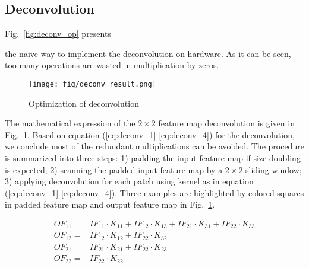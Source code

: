 \documentclass[conference]{IEEEtran}
\begin{document}
\begin{comment}
\begin{verbatim}
for no in Nof ----------> Output channel loop
  for (y,x) in (Y-K,X-K) --> Feature map loop
    for ni in Nif -------> input channel loop
      for (kx,ky) in (K,K) -----> Kernel loop
            Fout[no,y,x] += Fin[ni,y-ky,x-kx]
            * K[no,ni,ky,kx]
    Fout[no] += n[no]
\end{verbatim}
\end{comment}

\subsection{Deconvolution}\label{sec:opt_deconv}
Fig.~\ref{fig:deconv_op} presents 
\begin{comment}
an example of extending on a $2\times 2$ feature map, which is
\end{comment}
the naive way to implement the deconvolution on hardware. As it can be seen, too many operations are wasted in multiplication by zeros.


\begin{figure}[htbp]
	\centering
	\texttt{[image: fig/deconv\_result.png]}
	\caption{Optimization of deconvolution}
	\label{fig:deconv_result}
\end{figure}


 The mathematical expression of the $2\times 2$ feature map deconvolution is given in Fig.~\ref{fig:deconv_result}. Based on equation (\ref{eq:deconv_1}-\ref{eq:deconv_4}) for the deconvolution, we conclude most of the redundant multiplications can be avoided. The procedure is summarized into three steps: 1) padding the input feature map if size doubling is expected; 2) scanning the padded input feature map by a $2\times 2$ sliding window; 3) applying deconvolution for each patch using kernel as in equation (\ref{eq:deconv_1}-\ref{eq:deconv_4}). Three examples are highlighted by colored squares in padded feature map and output feature map in Fig.~\ref{fig:deconv_result}.

\begin{align}
    O\!F_{11}\!=&I\!F_{11}\!\cdot\!K_{11}\!+\!I\!F_{12}\!\cdot\!K_{13}\!+\!I\!F_{21}\!\cdot\!K_{31}\!+\!I\!F_{22}\!\cdot\!K_{33}\label{eq:deconv_1}\\
    O\!F_{12}\!=&I\!F_{12}\!\cdot\!K_{12}\!+\!I\!F_{22}\!\cdot\!K_{32}\\
    O\!F_{21}\!=&I\!F_{21}\!\cdot\!K_{21}\!+\!I\!F_{22}\!\cdot\!K_{23}\\
    O\!F_{22}\!=&I\!F_{22}\!\cdot\!K_{22}\label{eq:deconv_4}
\end{align}
\end{document}

